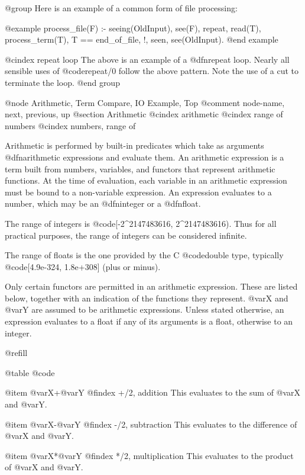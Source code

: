 @group
Here is an example of a common form of file processing:  

@example
process_file(F) :-
        seeing(OldInput),
        see(F),                 %
        repeat,
          read(T),              %
          process_term(T),      %
          T == end_of_file,     %
        !,
        seen,                   %
        see(OldInput).
@end example

@cindex repeat loop
The above is an example of a @dfn{repeat loop}.  Nearly all sensible uses
of @code{repeat/0} follow the above pattern.  Note the use of a cut to
terminate the loop.
@end group

@node Arithmetic, Term Compare, IO Example, Top
@comment  node-name,  next,  previous,  up
@section Arithmetic
@cindex arithmetic
@cindex range of numbers
@cindex numbers, range of

Arithmetic is performed by built-in predicates which take as arguments
@dfn{arithmetic expressions} and evaluate them.  An arithmetic expression
is a term built from numbers, variables, and functors that represent
arithmetic functions.  At the time of evaluation, each variable in an
arithmetic expression must be bound to a non-variable expression.
An expression evaluates to a number, which may be an @dfn{integer} or a 
@dfn{float}.

The range of integers is @code{[-2^2147483616, 2^2147483616)}.  Thus for
all practical purposes, the range of integers can be considered
infinite.

The range of floats is the one provided by the C @code{double} type,
typically @code{[4.9e-324, 1.8e+308]} (plus or minus).

Only certain functors are permitted in an arithmetic expression.  These are
listed below, together with an indication of the functions they represent.
@var{X} and @var{Y} are assumed to be arithmetic expressions.  Unless
stated otherwise, an expression evaluates to a float if any of its
arguments is a float, otherwise to an integer.

@refill

@table @code

@item @var{X}+@var{Y}
@findex +/2, addition
This evaluates to the sum of @var{X} and @var{Y}.

@item @var{X}-@var{Y}
@findex -/2, subtraction
This evaluates to the difference of @var{X} and @var{Y}.

@item @var{X}*@var{Y}
@findex */2, multiplication
This evaluates to the product of @var{X} and @var{Y}.

